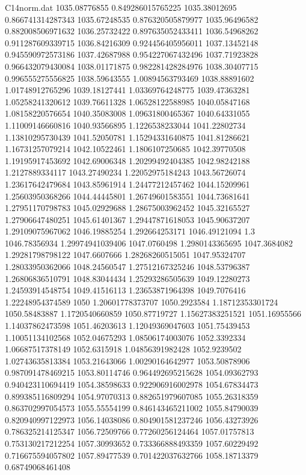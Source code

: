 \begin{filecontents}{C14norm.dat}
1035.08776855			0.849286015765225
1035.38012695			0.866741314287343
1035.67248535			0.876320505879977
1035.96496582			0.882008506971632
1036.25732422			0.897635052433411
1036.54968262			0.911287609339715
1036.84216309			0.924456405956011
1037.13452148			0.945590972573186
1037.42687988			0.954227067432496
1037.71923828			0.966432079430084
1038.01171875			0.982281428284976
1038.30407715			0.996555275556825
1038.59643555			1.00894563793469
1038.88891602			1.01748912765296
1039.18127441			1.03369764248775
1039.47363281			1.05258241320612
1039.76611328			1.06528122588985
1040.05847168			1.08158220576654
1040.35083008			1.09631800465367
1040.64331055			1.11009146660816
1040.93566895			1.1226538233044
1041.22802734			1.13810295730439
1041.52050781			1.15294331640875
1041.81286621			1.16731257079214
1042.10522461			1.1806107250685
1042.39770508			1.19195917453692
1042.69006348			1.20299492404385
1042.98242188			1.2127889334117
1043.27490234			1.22052975184243
1043.56726074			1.23617642479684
1043.85961914			1.24477212457462
1044.15209961			1.25603950368266
1044.44445801			1.26749601583551
1044.73681641			1.27951170798783
1045.02929688			1.28675003962452
1045.32165527			1.27906647480251
1045.61401367			1.29447871618053
1045.90637207			1.29109075967062
1046.19885254			1.292664253171
1046.49121094			1.3
1046.78356934			1.29974941039406
1047.0760498			1.2980143365695
1047.3684082			1.29281798798122
1047.6607666			1.28268260515051
1047.95324707			1.28033950362066
1048.24560547			1.27512167325246
1048.53796387			1.26806836510791
1048.83044434			1.25293286505639
1049.12280273			1.24593914548754
1049.41516113			1.23653871964398
1049.7076416			1.22248954374589
1050			1.20601778373707
1050.2923584			1.18712353301724
1050.58483887			1.1720540660859
1050.87719727			1.15627383251521
1051.16955566			1.14037862473598
1051.46203613			1.12049369047603
1051.75439453			1.10051134102568
1052.04675293			1.08506174003076
1052.3392334			1.06687517378149
1052.6315918			1.04856391982428
1052.9239502			1.02743635813384
1053.21643066			1.00290164642977
1053.50878906			0.987091478469215
1053.80114746			0.964492695215628
1054.09362793			0.940423110694419
1054.38598633			0.922906916002978
1054.67834473			0.899385116809294
1054.97070313			0.882651979607085
1055.26318359			0.863702997054573
1055.55554199			0.846143465211002
1055.84790039			0.820940997122973
1056.14038086			0.804901581237246
1056.43273926			0.786325214125347
1056.72509766			0.77260256124464
1057.01757813			0.753130217212254
1057.30993652			0.733366888493359
1057.60229492			0.716675594057802
1057.89477539			0.701422037632766
1058.18713379			0.68749068461408

\end{filecontents}
